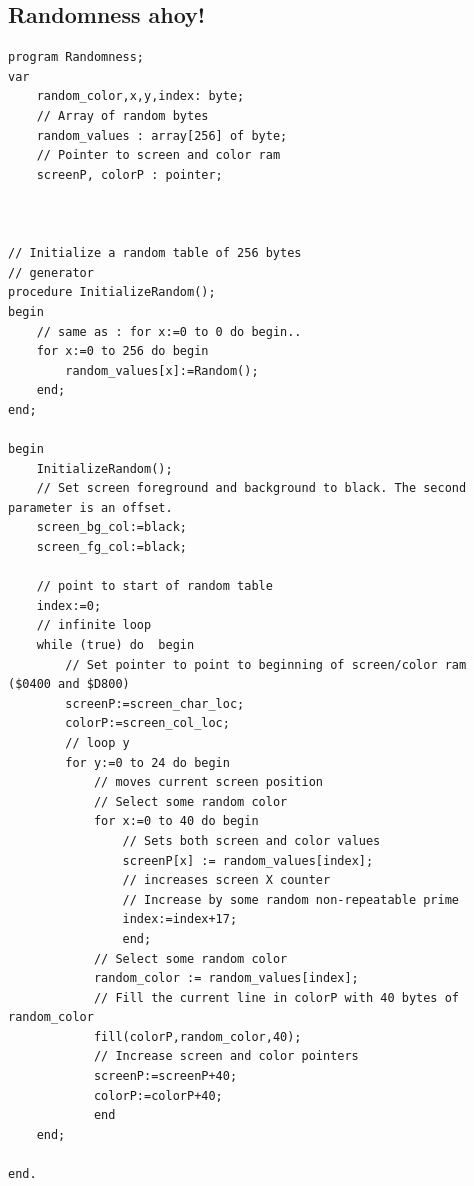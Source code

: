 \subsection{Randomness ahoy!}
\begin{lstlisting}
program Randomness;
var  
	random_color,x,y,index: byte; 
	// Array of random bytes
	random_values : array[256] of byte; 
	// Pointer to screen and color ram
	screenP, colorP : pointer;



// Initialize a random table of 256 bytes
// generator
procedure InitializeRandom();
begin
	// same as : for x:=0 to 0 do begin..
	for x:=0 to 256 do begin 
		random_values[x]:=Random();
    end;
end;

begin
	InitializeRandom();
	// Set screen foreground and background to black. The second parameter is an offset.
	screen_bg_col:=black;
	screen_fg_col:=black;
	
	// point to start of random table
	index:=0; 
	// infinite loop
	while (true) do  begin
		// Set pointer to point to beginning of screen/color ram ($0400 and $D800)
		screenP:=screen_char_loc;
		colorP:=screen_col_loc;
		// loop y		
		for y:=0 to 24 do begin
			// moves current screen position
			// Select some random color
			for x:=0 to 40 do begin
				// Sets both screen and color values
				screenP[x] := random_values[index];
				// increases screen X counter
				// Increase by some random non-repeatable prime
				index:=index+17;
	    		end;
			// Select some random color
			random_color := random_values[index];
			// Fill the current line in colorP with 40 bytes of random_color
			fill(colorP,random_color,40);
			// Increase screen and color pointers
			screenP:=screenP+40;
			colorP:=colorP+40;
			end
	end;

end.
\end{lstlisting}

